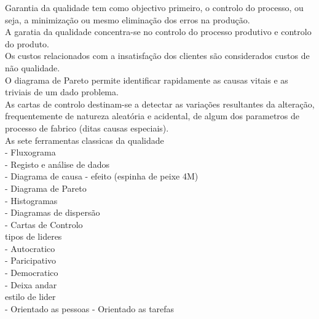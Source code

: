 Garantia da qualidade tem como objectivo primeiro, o controlo do processo, ou seja, a minimização ou mesmo eliminação dos erros na produção.\\

A garatia da qualidade concentra-se no controlo do processo produtivo e controlo do produto.\\

Os custos relacionados com a insatisfação dos clientes são considerados custos de não qualidade.\\

O diagrama de Pareto permite identificar rapidamente as causas vitais e as triviais de um dado problema.\\

As cartas de controlo destinam-se a detectar as variações resultantes da alteração, frequentemente de natureza aleatória e acidental, de algum dos parametros de processo de fabrico (ditas causas especiais).\\

As sete ferramentas classicas da qualidade\\
- Fluxograma\\
- Registo e análise de dados\\
- Diagrama de causa - efeito (espinha de peixe 4M)\\
- Diagrama de Pareto\\
- Histogramas\\
- Diagramas de dispersão\\
- Cartas de Controlo\\

tipos de lideres\\
- Autocratico\\
- Paricipativo \\
- Democratico \\
- Deixa andar\\

estilo de lider\\
- Orientado as pessoas
- Orientado as tarefas\\

